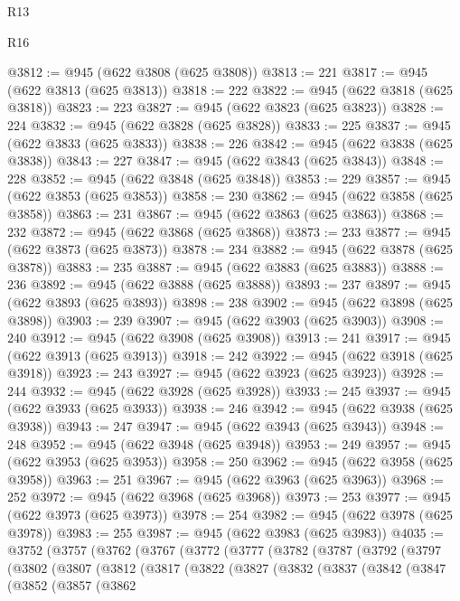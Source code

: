 \begin{lexlean}{R13}
\begin{lexlean}{R16}
\begin{coremodule}
{{{{{{{{{{{{{{{{{{{{{{{{{{{{{{{{{{{{{{{{{{{{{{{{{{{{{{{{{{{{{{{{{{{{{{{{{{{{{{{{{{{{{{{{{{{{{{{{{{{{{{{{{{{{{{{{{@3812 := @945 (@622 @3808 (@625 @3808))
@3813 := 221
@3817 := @945 (@622 @3813 (@625 @3813))
@3818 := 222
@3822 := @945 (@622 @3818 (@625 @3818))
@3823 := 223
@3827 := @945 (@622 @3823 (@625 @3823))
@3828 := 224
@3832 := @945 (@622 @3828 (@625 @3828))
@3833 := 225
@3837 := @945 (@622 @3833 (@625 @3833))
@3838 := 226
@3842 := @945 (@622 @3838 (@625 @3838))
@3843 := 227
@3847 := @945 (@622 @3843 (@625 @3843))
@3848 := 228
@3852 := @945 (@622 @3848 (@625 @3848))
@3853 := 229
@3857 := @945 (@622 @3853 (@625 @3853))
@3858 := 230
@3862 := @945 (@622 @3858 (@625 @3858))
@3863 := 231
@3867 := @945 (@622 @3863 (@625 @3863))
@3868 := 232
@3872 := @945 (@622 @3868 (@625 @3868))
@3873 := 233
@3877 := @945 (@622 @3873 (@625 @3873))
@3878 := 234
@3882 := @945 (@622 @3878 (@625 @3878))
@3883 := 235
@3887 := @945 (@622 @3883 (@625 @3883))
@3888 := 236
@3892 := @945 (@622 @3888 (@625 @3888))
@3893 := 237
@3897 := @945 (@622 @3893 (@625 @3893))
@3898 := 238
@3902 := @945 (@622 @3898 (@625 @3898))
@3903 := 239
@3907 := @945 (@622 @3903 (@625 @3903))
@3908 := 240
@3912 := @945 (@622 @3908 (@625 @3908))
@3913 := 241
@3917 := @945 (@622 @3913 (@625 @3913))
@3918 := 242
@3922 := @945 (@622 @3918 (@625 @3918))
@3923 := 243
@3927 := @945 (@622 @3923 (@625 @3923))
@3928 := 244
@3932 := @945 (@622 @3928 (@625 @3928))
@3933 := 245
@3937 := @945 (@622 @3933 (@625 @3933))
@3938 := 246
@3942 := @945 (@622 @3938 (@625 @3938))
@3943 := 247
@3947 := @945 (@622 @3943 (@625 @3943))
@3948 := 248
@3952 := @945 (@622 @3948 (@625 @3948))
@3953 := 249
@3957 := @945 (@622 @3953 (@625 @3953))
@3958 := 250
@3962 := @945 (@622 @3958 (@625 @3958))
@3963 := 251
@3967 := @945 (@622 @3963 (@625 @3963))
@3968 := 252
@3972 := @945 (@622 @3968 (@625 @3968))
@3973 := 253
@3977 := @945 (@622 @3973 (@625 @3973))
@3978 := 254
@3982 := @945 (@622 @3978 (@625 @3978))
@3983 := 255
@3987 := @945 (@622 @3983 (@625 @3983))
@4035 := @3752
    (@3757
      (@3762
        (@3767
          (@3772
            (@3777
              (@3782
                (@3787
                  (@3792
                    (@3797
                      (@3802
                        (@3807
                          (@3812
                            (@3817
                              (@3822
                                (@3827
                                  (@3832
                                    (@3837
                                      (@3842
                                        (@3847
                                          (@3852
                                            (@3857
                                              (@3862
}}}}}}}}}}}}}}}}}}}}}}}}}}}}}}}}}}}}}}}}}}}}}}}}}}}}}}}}}}}}}}}}}}}}}}}}}}}}}}}}}}}}}}}}}}}}}}}}}}}}}}}}}}}}}}}}}
\end{coremodule}
\end{lexlean}
\end{lexlean}
